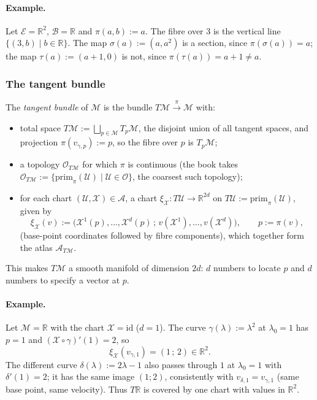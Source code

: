 \documentclass[11pt]{article}
\newcommand{\TpM}{T_p\mathcal M}
\begin{document}
\paragraph{Example.} Let $\mathcal E=\mathbb R^2$, $\mathcal B=\mathbb R$ and $\pi(a,b):=a$. The fibre over $3$ is the vertical line $\{(3,b)\mid b\in\mathbb R\}$. The map $\sigma(a):=(a,a^2)$ is a section, since $\pi(\sigma(a))=a$; the map $\tau(a):=(a+1,0)$ is not, since $\pi(\tau(a))=a+1\neq a$.

\subsubsection*{The tangent bundle}
The \emph{tangent bundle} of $\mathcal M$ is the bundle $T\mathcal M\xrightarrow{\ \pi\ }\mathcal M$ with:
\begin{itemize}
  \item total space $T\mathcal M:=\bigsqcup_{p\in\mathcal M}\TpM$, the disjoint union of all tangent spaces, and projection $\pi(v_{\gamma,p}):=p$, so the fibre over $p$ is $\TpM$;
  \item a topology $\mathcal O_{T\mathcal M}$ for which $\pi$ is continuous (the book takes $\mathcal O_{T\mathcal M}:=\{\mathrm{prim}_\pi(\mathcal U)\mid\mathcal U\in\mathcal O\}$, the coarsest such topology);
  \item for each chart $(\mathcal U,\mathcal X)\in\mathcal A$, a chart $\xi_{\mathcal X}:T\mathcal U\to\mathbb R^{2d}$ on $T\mathcal U:=\mathrm{prim}_\pi(\mathcal U)$, given by
  \[
  \xi_{\mathcal X}(v):=\big(\mathcal X^1(p),\dots,\mathcal X^d(p)\,;\,v(\mathcal X^1),\dots,v(\mathcal X^d)\big),\qquad p:=\pi(v),
  \]
  (base-point coordinates followed by fibre components), which together form the atlas $\mathcal A_{T\mathcal M}$.
\end{itemize}
This makes $T\mathcal M$ a smooth manifold of dimension $2d$: $d$ numbers to locate $p$ and $d$ numbers to specify a vector at $p$.

\paragraph{Example.} Let $\mathcal M=\mathbb R$ with the chart $\mathcal X=\mathrm{id}$ ($d=1$). The curve $\gamma(\lambda):=\lambda^2$ at $\lambda_0=1$ has $p=1$ and $(\mathcal X\circ\gamma)'(1)=2$, so
\[
\xi_{\mathcal X}(v_{\gamma,1})=(1\,;\,2)\in\mathbb R^2.
\]
The different curve $\delta(\lambda):=2\lambda-1$ also passes through $1$ at $\lambda_0=1$ with $\delta'(1)=2$; it has the same image $(1;2)$, consistently with $v_{\delta,1}=v_{\gamma,1}$ (same base point, same velocity). Thus $T\mathbb R$ is covered by one chart with values in $\mathbb R^2$.
\end{document}
